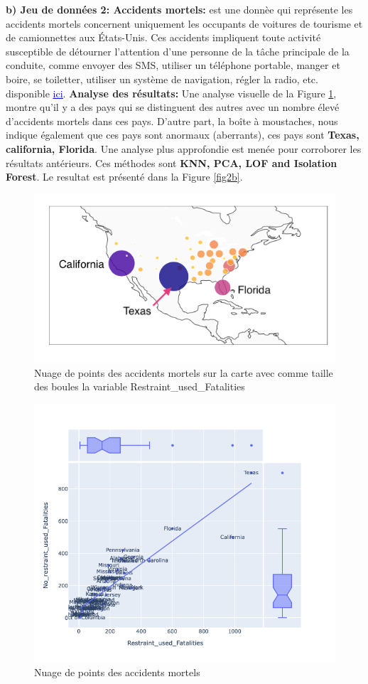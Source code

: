 \noindent\textbf{b) Jeu de données 2: Accidents mortels:}
 est une donnèe qui représente les accidents mortels concernent uniquement les occupants de voitures de tourisme et de camionnettes aux États-Unis. Ces accidents impliquent toute activité susceptible de détourner l'attention d'une personne de la tâche principale de la conduite, comme envoyer des SMS, utiliser un téléphone portable, manger et boire, se toiletter, utiliser un système de navigation, régler la radio, etc. disponible  \href{https://www.bts.dot.gov/content/passenger-car-and-light-truck-occupants-killed-and-restraint-use}{\textcolor{blue}{\underline{ici}}}. \newl
\noindent\textbf{Analyse des résultats:}
Une analyse visuelle de la Figure \ref{fig2}, montre qu'il y a des pays qui se distinguent des autres avec un nombre élevé d'accidents mortels dans ces pays. D'autre part, la boîte à moustaches, nous indique également que ces pays sont anormaux (aberrants), ces pays sont \textbf{Texas, california, Florida}. Une analyse plus approfondie est menée pour corroborer les résultats antérieurs. Ces méthodes sont \textbf{ KNN, PCA, LOF and Isolation Forest}. Le resultat est présenté dans la Figure  \ref{fig2b}. 
\begin{figure}[H]
    \centering
    \includegraphics[width=.5\textwidth]{ADOA/Images/fat1png.png}
    \caption{Nuage de points des accidents mortels sur la carte avec comme taille des boules la variable Restraint\_used\_Fatalities}%
    \label{fig2}
\end{figure}

 \begin{figure}[H]
    \centering
    \includegraphics[width=.50\textwidth]{ADOA/Images/Fatal1.png}
    \caption{Nuage de points des accidents mortels}%
    \label{fig2a}
\end{figure}


